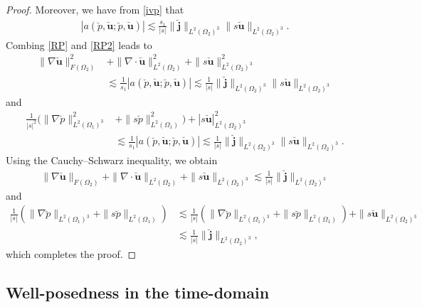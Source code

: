 \documentclass[final,leqno]{siamltex}
\begin{document}
\begin{proof}
Moreover, we have from \eqref{ivp}  that
\begin{align}\label{RP2}
 |a(\breve p, \breve {\boldsymbol u}; \breve p, \breve {\boldsymbol u}) |
 \lesssim \frac{s_1}{|s|} \|\breve {\boldsymbol j}\|_{L^2 (\Omega_2)^3} \| s
\breve {\boldsymbol u}\|_{L^2 (\Omega_2)^3 }.
\end{align}
Combing \eqref{RP} and \eqref{RP2}  leads to
\begin{align*}
\|\nabla \breve {{\boldsymbol u}}\|^2_{F(\Omega_2)}
& +\|\nabla \cdot \breve {\boldsymbol u}\|^2_{L^2(\Omega_2)}+ \| s\breve
{\boldsymbol u}\|^2_{L^2 (\Omega_2)^3} \\
&\lesssim  \frac{1}{s_1} |a(\breve p, \breve {\boldsymbol u}; \breve p, \breve
{\boldsymbol u}) | \lesssim \frac{1}{|s|} \|\breve {\boldsymbol j}\|_{L^2
(\Omega_2)^3} \| s \breve {\boldsymbol u}\|_{L^2 (\Omega_2)^3 }
\end{align*}
and
\begin{align*}
 \frac{1}{|s|^2} \Big( \|\nabla \breve {p}\|^2_{L^2 (\Omega_1)^3} &+\|s \breve
p\|^2_{L^2 (\Omega_1)} \Big) +|s \breve {\boldsymbol u}|^2_{L^2
(\Omega_2)^3}\\
&\lesssim \frac{1}{s_1} |a(\breve p, \breve {\boldsymbol u}; \breve p,
\breve {\boldsymbol u}) | \lesssim \frac{1}{|s|} \|\breve {\boldsymbol j}\|_{L^2
(\Omega_2)^3} \| s \breve {\boldsymbol u}\|_{L^2 (\Omega_2)^3 }.
\end{align*}
Using the Cauchy--Schwarz inequality, we obtain
\begin{align*}
 \|\nabla \breve {{\boldsymbol u}}\|_{F(\Omega_2)}
 +\|\nabla \cdot \breve {\boldsymbol u}\|_{L^2(\Omega_2)}+ \| s\breve
{\boldsymbol u}\|_{L^2 (\Omega_2)^3} \lesssim \frac{1}{ |s|} \|\breve
{\boldsymbol j}\|_{L^2(\Omega_2)^3}
\end{align*}
and
\begin{align*}
 \frac{1}{|s|} \left( \|\nabla \breve {p}\|_{L^2 (\Omega_1)^3} +\|s \breve
p\|_{L^2 (\Omega_1)} \right)& \lesssim  \frac{1}{|s|} \left( \|\nabla \breve
{p}\|_{L^2 (\Omega_1)^3} +\|s \breve p\|_{L^2 (\Omega_1)} \right) +\| s \breve
{\boldsymbol u}\|_{L^2 (\Omega_2)^3 }\\
&\lesssim \frac{1}{ |s|} \|\breve {\boldsymbol j}\|_{L^2(\Omega_2)^3},
\end{align*}
which completes the proof.
\end{proof}

\subsection{Well-posedness in the time-domain}
\end{document}
